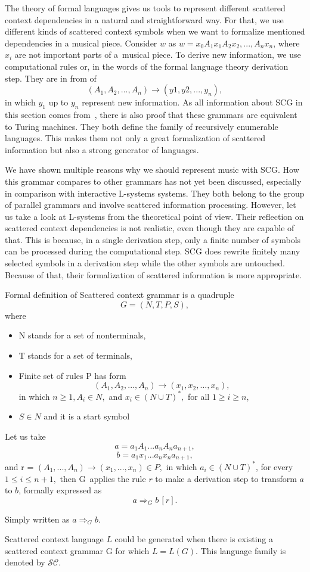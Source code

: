 The theory of formal languages gives us tools to represent different scattered context dependencies in a natural and straightforward way. For that, we use different kinds of scattered context symbols when we want to formalize mentioned dependencies in a musical piece. Consider $w$ as $w = x_0A_1x_1A_2x_2,...,A_nx_n$, where $x_i$ are not important parts of a~musical piece. To derive new information, we use computational rules or, in the words of the formal language theory derivation step. They are in from of $$(A_1, A_2, ..., A_n) \rightarrow (y1, y2, ..., y_n),$$ in which $y_1$ up to $y_n$ represent new information. As all information about SCG in this section comes from~\cite{meduna2010scattered}, there is also proof that these grammars are equivalent to Turing machines. They both define the family of recursively enumerable languages. This makes them not only a great formalization of scattered information but also a strong generator of languages.

We have shown multiple reasons why we should represent music with SCG. How this grammar compares to other grammars has not yet been discussed, especially in comparison with interactive L-systems systems. They both belong to the group of parallel grammars and involve scattered information processing. However, let us take a look at L-systems from the theoretical point of view. Their reflection on scattered context dependencies is not realistic, even though they are capable of that. This is because, in a single derivation step, only a finite number of symbols can be processed during the computational step. SCG does rewrite finitely many selected symbols in a derivation step while the other symbols are untouched. Because of that, their formalization of scattered information is more appropriate.

\begin{definition}
\label{Def21}
Formal definition of Scattered context grammar is a quadruple $$G = (N, T, P, S),$$ where 
\begin{itemize}
    \item{N stands for a set of nonterminals,}
    \item{T stands for a set of terminals,}
    \item{Finite set of rules P has form $$(A_1, A_2, ..., A_n) \rightarrow (x_1, x_2, ..., x_n),$$ in which $n \ge 1, A_i \in N,$ and $x_i \in (N \cup T)^*,$ for all $1 \ge i \ge n$,}
    \item{$S \in N$ and it is a start symbol}
\end{itemize}
Let us take
$$a = a_1A_1...a_nA_na_{n+1},$$
$$b = a_1x_1...a_nx_na_{n+1},$$ 
and r = $(A_1,...,A_n) \rightarrow (x_1,...,x_n) \in P,$ in which $a_i \in (N \cup T)^*$, for every $1 \leq i \leq n + 1,$ then G~applies the rule $r$ to make a derivation step to transform $a$ to $b$, formally expressed as 
$$a \Rightarrow_G b \, [r].$$

Simply written as $a \Rightarrow_G b$.

Scattered context language $L$ could be generated when there is existing a scattered context grammar G for which $L = L(G).$ This language family is denoted by $\mathcal{SC}$.
\end{definition}

